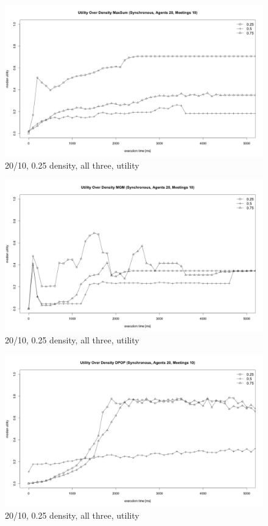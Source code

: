 \begin{figure}[H]
\centering
\includegraphics[width=430px]{graphics/experiments/static/st_5}
\caption{20/10, 0.25 density, all three, utility}
\label{fig:mgm_graph}
\end{figure}
\begin{figure}[H]
\centering
\includegraphics[width=430px]{graphics/experiments/static/st_6}
\caption{20/10, 0.25 density, all three, utility}
\label{fig:mgm_graph}
\end{figure}
\begin{figure}[H]
\centering
\includegraphics[width=430px]{graphics/experiments/static/st_7}
\caption{20/10, 0.25 density, all three, utility}
\label{fig:mgm_graph}
\end{figure}

